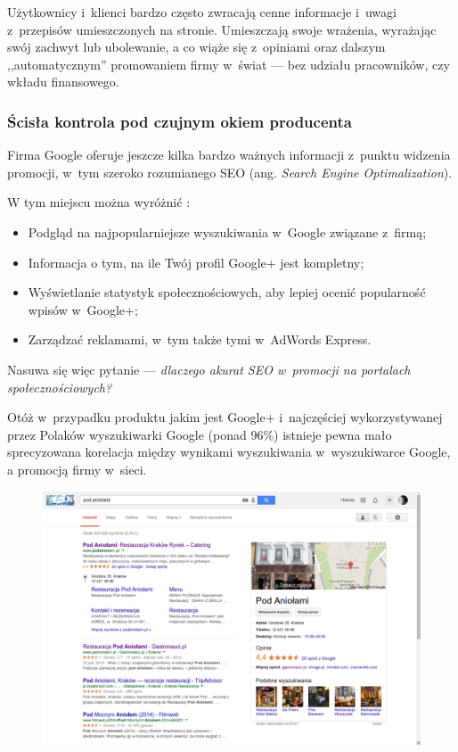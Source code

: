 Użytkownicy i~klienci bardzo często zwracają cenne informacje i~uwagi z~przepisów umieszczonych na stronie. Umieszczają swoje wrażenia, wyrażając swój zachwyt lub ubolewanie, a co wiąże się z~opiniami oraz dalszym ,,automatycznym'' promowaniem firmy w~świat --- bez udziału pracowników, czy wkładu finansowego.


\subsubsection{Ścisła kontrola pod czujnym okiem producenta}
Firma Google oferuje jeszcze kilka bardzo ważnych informacji z~punktu widzenia promocji, w~tym szeroko rozumianego SEO (ang. \textit{Search Engine Optimalization}).

W tym miejscu można wyróżnić \parencite{url:google-plus-firmy-panel-google}: 

\begin{itemize}
\item Podgląd na najpopularniejsze wyszukiwania w~Google związane z~firmą;
\item Informacja o tym, na ile Twój profil Google+ jest kompletny;
\item Wyświetlanie statystyk społecznościowych, aby lepiej ocenić popularność wpisów w~Google+;
\item Zarządzać reklamami, w~tym także tymi w~AdWords Express.
\end{itemize}

Nasuwa się więc pytanie --- \emph{dlaczego akurat SEO w~promocji na portalach społecznościowych?}

Otóż w~przypadku produktu jakim jest Google+ i~najczęściej wykorzystywanej przez Polaków wyszukiwarki Google (ponad 96\%) istnieje pewna mało sprecyzowana korelacja między wynikami wyszukiwania w~wyszukiwarce Google, a promocją firmy w~sieci. 

\begin{figure}[!h]
\centering
    \scalebox{0.32}
    {
        \includegraphics{images/search-result-company-in-google-search-engine.png}
    }
    \label{fig:search-result-company-in-google-search-engine}
\end{figure}

